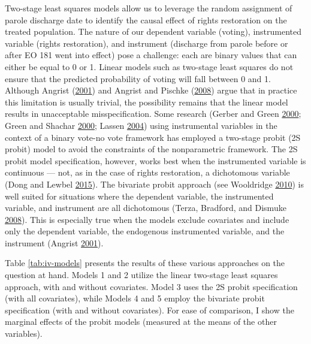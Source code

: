 \documentclass[
  12pt,
]{article}
\begin{document}
Two-stage least squares models allow us to leverage the random assignment of parole discharge date to identify the causal effect of rights restoration on the treated population. The nature of our dependent variable (voting), instrumented variable (rights restoration), and instrument (discharge from parole before or after EO 181 went into effect) pose a challenge: each are binary values that can either be equal to 0 or 1. Linear models such as two-stage least squares do not ensure that the predicted probability of voting will fall between 0 and 1. Although Angrist (\protect\hyperlink{ref-Angrist2001}{2001}) and Angrist and Pischke (\protect\hyperlink{ref-Angrist2008}{2008}) argue that in practice this limitation is usually trivial, the possibility remains that the linear model results in unacceptable misspecification. Some research (Gerber and Green \protect\hyperlink{ref-Gerber2000}{2000}; Green and Shachar \protect\hyperlink{ref-Green2000}{2000}; Lassen \protect\hyperlink{ref-Lassen2004}{2004}) using instrumental variables in the context of a binary vote-no vote framework has employed a two-stage probit (2S probit) model to avoid the constraints of the nonparametric framework. The 2S probit model specification, however, works best when the instrumented variable is continuous --- not, as in the case of rights restoration, a dichotomous variable (Dong and Lewbel \protect\hyperlink{ref-Dong2015}{2015}). The bivariate probit approach (see Wooldridge \protect\hyperlink{ref-Wooldridge2010}{2010}) is well suited for situations where the dependent variable, the instrumented variable, and instrument are all dichotomous (Terza, Bradford, and Dismuke \protect\hyperlink{ref-Terza2008}{2008}). This is especially true when the models exclude covariates and include only the dependent variable, the endogenous instrumented variable, and the instrument (Angrist \protect\hyperlink{ref-Angrist2001}{2001}).

Table \ref{tab:iv-models} presents the results of these various approaches on the question at hand. Models 1 and 2 utilize the linear two-stage least squares approach, with and without covariates. Model 3 uses the 2S probit specification (with all covariates), while Models 4 and 5 employ the bivariate probit specification (with and without covariates). For ease of comparison, I show the marginal effects of the probit models (measured at the means of the other variables).

\begin{singlespace}

\end{singlespace}
\end{document}
